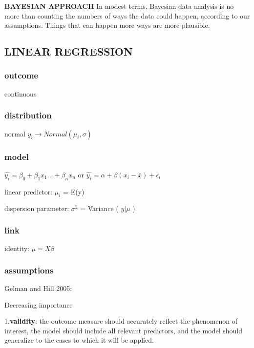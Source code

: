 \documentclass[
]{article}
\begin{document}
\textbf{BAYESIAN APPROACH} In modest terms, Bayesian data analysis is no
more than counting the numbers of ways the data could happen, according
to our assumptions. Things that can happen more ways are more plausible.

\hypertarget{linear-regression}{%
\subsection{LINEAR REGRESSION}\label{linear-regression}}

\hypertarget{outcome}{%
\subsubsection{outcome}\label{outcome}}

continuous

\hypertarget{distribution}{%
\subsubsection{distribution}\label{distribution}}

normal \(y_i \to Normal(\mu_i, \sigma)\)

\hypertarget{model}{%
\subsubsection{model}\label{model}}

\(\hat{y_i}=\beta_0 +\beta_1x_1...+\beta_n x_n\) or
\(\hat{y_i}=\alpha +\beta(x_i-\bar{x}) + \epsilon_i\)

linear predictor: \(\mu_i\) = E(y)

dispersion parameter: \(\sigma^2\) = Variance ( \(y | \mu\) )

\hypertarget{link}{%
\subsubsection{link}\label{link}}

identity: \(\mu = X \beta\)

\hypertarget{assumptions}{%
\subsubsection{assumptions}\label{assumptions}}

Gelman and Hill 2005:

Decreasing importance

1.\textbf{validity}: the outcome measure should accurately reflect the
phenomenon of interest, the model should include all relevant
predictors, and the model should generalize to the cases to which it
will be applied.
\end{document}
